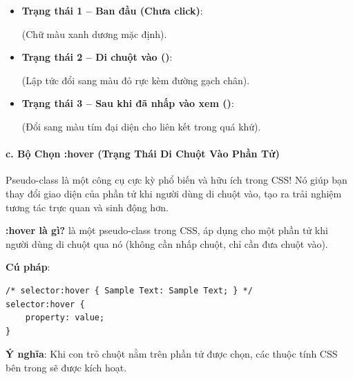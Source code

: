 \begin{browserWindow}
\sffamily\small
\begin{itemize}[leftmargin=1.5em, itemsep=3pt, parsep=0pt]
    \item \textbf{Trạng thái 1 -- Ban đầu (Chưa click)}:
    \par\vspace{2pt}
    \quad (Chữ màu xanh dương mặc định).
    \par\vspace{4pt}
    \item \textbf{Trạng thái 2 -- Di chuột vào ()}:
    \par\vspace{2pt}
    \quad (Lập tức đổi sang màu đỏ rực kèm đường gạch chân).
    \par\vspace{4pt}
    \item \textbf{Trạng thái 3 -- Sau khi đã nhấp vào xem ()}:
    \par\vspace{2pt}
    \quad (Đổi sang màu tím đại diện cho liên kết trong quá khứ).
\end{itemize}
\end{browserWindow}

\paragraph{c. Bộ Chọn :hover (Trạng Thái Di Chuột Vào Phần Tử)}

Pseudo-class  là một công cụ cực kỳ phổ biến và hữu ích trong CSS! Nó giúp bạn thay đổi giao diện của phần tử khi người dùng di chuột vào, tạo ra trải nghiệm tương tác trực quan và sinh động hơn.

\begin{conceptBox}
\textbf{:hover là gì?}  là một pseudo-class trong CSS, áp dụng cho một phần tử khi người dùng di chuột qua nó (không cần nhấp chuột, chỉ cần đưa chuột vào).
\par\vspace{4pt}
\textbf{Cú pháp}:
\begin{codeWindow}
\begin{lstlisting}[language=CSS3]
/* selector:hover { Sample Text: Sample Text; } */
selector:hover {
    property: value;
}
\end{lstlisting}
\end{codeWindow}
\textbf{Ý nghĩa}: Khi con trỏ chuột nằm trên phần tử được chọn, các thuộc tính CSS bên trong  sẽ được kích hoạt.
\end{conceptBox}


